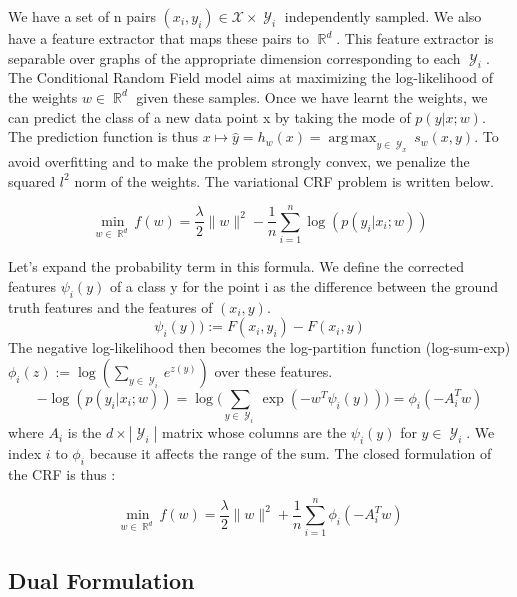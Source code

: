 \documentclass{article}
\DeclareMathOperator{\R}{\mathbb{R}}
\DeclareMathOperator{\1}{\mathbb{1}}
\DeclareMathOperator{\Y}{\mathcal{Y}}
\DeclareMathOperator*{\argmax}{arg\,max}
\begin{document}
We have a set of n pairs $(x_i, y_i) \in \mathcal{X} \times \Y_i$ independently sampled.
We also have a feature extractor that maps these pairs to $\R^d$.
This feature extractor is separable over graphs of the appropriate dimension corresponding to each $\Y_i$.
The Conditional Random Field model aims at maximizing the log-likelihood of the weights $w\in \R^d$ given these samples.
Once we have learnt the weights, we can predict the class of a new data point x by taking the mode of $p(y|x ; w)$.
The prediction function is thus $x \mapsto \hat{y} = h_w(x) = \argmax_{y\in \Y_x} s_w(x, y)$.
To avoid overfitting and to make the problem strongly convex, we penalize the squared $l^2$ norm of the weights.
The variational CRF problem is written below.

\begin{equation}
\min_{w\in\R^d} f(w) = \frac{\lambda}{2}\|w\|^2 - \frac{1}{n}   \sum_{i=1}^{n} \log(p(y_i|x_i; w))	
\end{equation}

Let's expand the probability term in this formula.
We define the corrected features $\psi_i(y)$ of a class y for the point i as the difference between the ground truth features and the features of $(x_i, y)$.
\begin{equation}
	\psi_i(y)) := F(x_i, y_i) - F(x_i, y)
\end{equation}
The negative log-likelihood then becomes the log-partition function (log-sum-exp) $\phi_i(z):=\log(\sum_{y\in \Y_i} e^{z(y)})$ over these features.
\begin{equation}
	- \log(p(y_i|x_i; w)) = \log \bigg ( \sum_{y \in \Y_i}  \exp(-w^T\psi_i(y)) \bigg ) = \phi_i(-A_i^Tw)	
\end{equation}
where $A_i$  is the $d\times |\Y_i|$ matrix whose columns are the $\psi_i(y)$ for $y \in \Y_i$.
We index $i$ to $\phi_i$ because it affects the range of the sum.
The closed formulation of the CRF is thus :

\begin{equation}
\min_{w\in\R^d} f(w) = \frac{\lambda}{2}\|w\|^2 + \frac{1}{n}   \sum_{i=1}^{n} \phi_i(-A_i^Tw)	
\end{equation}


\subsection{Dual Formulation}
\end{document}
